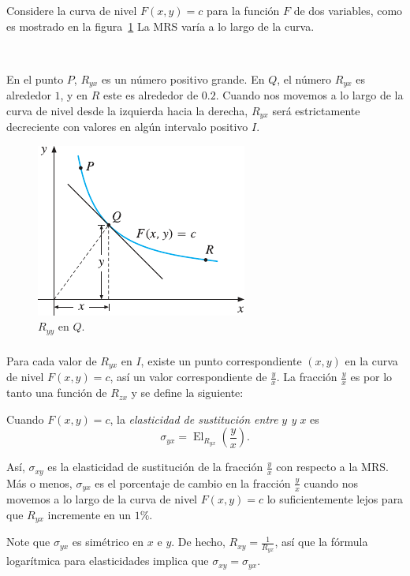 \begin{frame}
\frametitle{\secname}
	\begin{minipage}{0.45\textwidth}
		\begin{example}
		Considere la curva de nivel $F\left(x,y\right)=c$ para la función $F$ de dos variables, como es mostrado en la figura~\ref{fig:RYY} La \textsc{MRS} varía a lo largo de la curva.
		
		\
		
		En el punto $P$, $R_{yx}$ es un número positivo grande. En $Q$, el número $R_{yx}$ es alrededor $1$, y en $R$ este es alrededor de $0.2$. Cuando nos movemos a lo largo de la curva de nivel desde la izquierda hacia la derecha, $R_{yx}$ será estrictamente decreciente con valores en algún intervalo positivo $I$.
		\end{example}
	\end{minipage}
	\begin{minipage}{0.45\textwidth}
		\begin{figure}
			\centering
			\includegraphics[width=0.4\paperwidth]{ryy}
			\caption{$R_{yy}$ en $Q$.}\label{fig:RYY}
		\end{figure}
	\end{minipage}
\end{frame}

\begin{frame}[t]
\frametitle{\secname}
Para cada valor de $R_{yx}$ en $I$, existe un punto correspondiente $\left(x,y\right)$ en la curva de nivel $F\left(x,y\right)=c$, así un valor correspondiente de $\frac{y}{x}$. La fracción $\frac{y}{x}$ es por lo tanto una función de $R_{zx}$ y se define la siguiente:
\begin{definition}
Cuando $F\left(x,y\right)=c$, la \emph{elasticidad de sustitución entre} $y$ \emph{y} $x$ es \[ \sigma_{yx}=\operatorname{El}_{R_{yx}}\left(\frac{y}{x}\right). \]
\end{definition}

Así, $\sigma_{xy}$ es la elasticidad de sustitución de la fracción $\frac{y}{x}$ con respecto a la \textsc{MRS}. Más o menos, $\sigma_{yx}$ es el porcentaje de cambio en la fracción $\frac{y}{x}$ cuando nos movemos a lo largo de la curva de nivel $F\left(x,y\right)=c$ lo suficientemente lejos para que $R_{yx}$ incremente en un $1\%$.

\begin{remark}
Note que $\sigma_{yx}$ es simétrico en $x$ e $y$. De hecho, $R_{xy}=\frac{1}{R_{yx}}$, así que la fórmula logarítmica para elasticidades implica que $\sigma_{xy}=\sigma_{yx}$.
\end{remark}

\end{frame}

